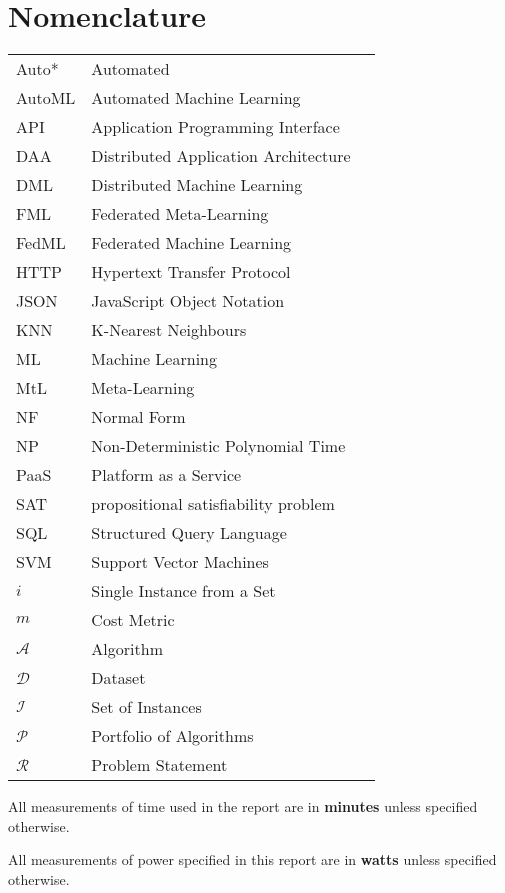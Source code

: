 \section*{\Huge{Nomenclature}}
\begin{tabular}{lp{9cm}l}
Auto*&Automated\\
AutoML&Automated Machine Learning\\
API&Application Programming Interface\\
DAA&Distributed Application Architecture\\
DML&Distributed Machine Learning\\
FML&Federated Meta-Learning\\
FedML&Federated Machine Learning\\
HTTP&Hypertext Transfer Protocol\\
JSON&JavaScript Object Notation\\
KNN&K-Nearest Neighbours\\
ML&Machine Learning\\
MtL&Meta-Learning\\
NF&Normal Form\\
NP& Non-Deterministic Polynomial Time\\
PaaS&Platform as a Service\\
SAT&propositional satisfiability problem\\
SQL&Structured Query Language\\
SVM&Support Vector Machines\\

${\displaystyle{i}}$&Single Instance from a Set\\
${\displaystyle{m}}$&Cost Metric\\
${\displaystyle{\mathcal{A}}}$&Algorithm\\
${\displaystyle{\mathcal{D}}}$&Dataset\\
${\displaystyle{\mathcal{I}}}$&Set of Instances\\
${\displaystyle{\mathcal{P}}}$&Portfolio of Algorithms\\
${\displaystyle{\mathcal{R}}}$&Problem Statement

\end{tabular}
\vspace{2cm}

All measurements of time used in the report are in \textbf{minutes} unless specified otherwise.

All measurements of power specified in this report are in \textbf{watts} unless specified otherwise.
